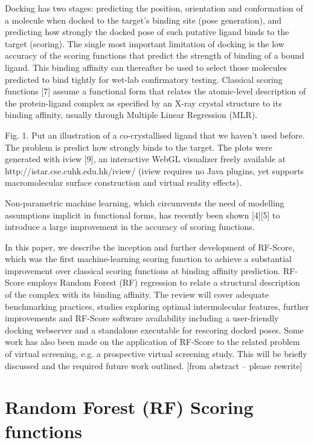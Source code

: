 \documentclass{llncs}
\begin{document}
Docking has two stages: predicting the position, orientation and conformation of a molecule when docked to the target's binding site (pose generation), and predicting how strongly the docked pose of such putative ligand binds to the target (scoring). The single most important limitation of docking is the low accuracy of the scoring functions that predict the strength of binding of a bound ligand. This binding affinity can thereafter be used to select those molecules predicted to bind tightly for wet-lab confirmatory testing. Classical scoring functions [7] assume a functional form that relates the atomic-level description of the protein-ligand complex as specified by an X-ray crystal structure to its binding affinity, usually through Multiple Linear Regression (MLR).

Fig. 1. Put an illustration of a co-crystallised ligand that we haven’t used before. The problem is predict how strongly binds to the target. The plots were generated with iview [9], an interactive WebGL visualizer freely available at http://istar.cse.cuhk.edu.hk/iview/ (iview requires no Java plugins, yet supports macromolecular surface construction and virtual reality effects).

Non-parametric machine learning, which circumvents the need of modelling assumptions implicit in functional forms, has recently been shown [4][5] to introduce a large improvement in the accuracy of scoring functions. 

In this paper, we describe the inception and further development of RF-Score, which was the first machine-learning scoring function to achieve a substantial improvement over classical scoring functions at binding affinity prediction. RF-Score employs Random Forest (RF) regression to relate a structural description of the complex with its binding affinity. The review will cover adequate benchmarking practices, studies exploring optimal intermolecular features, further improvements and RF-Score software availability including a user-friendly docking webserver and a standalone executable for rescoring docked poses. Some work has also been made on the application of RF-Score to the related problem of virtual screening, e.g. a prospective virtual screening study. This will be briefly discussed and the required future work outlined. [from abstract – please rewrite]

\section{Random Forest (RF) Scoring functions}
\end{document}
